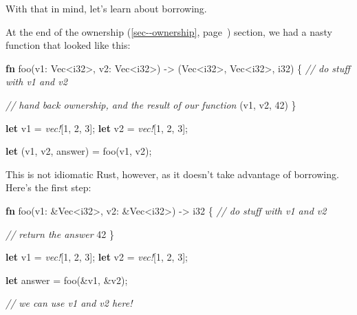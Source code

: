 \documentclass[a4paper,]{book}
\renewcommand*{\hyperref}[2][\ar]{%
  \def\ar{#2}%
  #2 (\autoref{#1}, page~\pageref{#1})}
\newenvironment{Shaded}{\begin{snugshade}}{\end{snugshade}}
\newcommand{\KeywordTok}[1]{\textcolor[rgb]{0.13,0.29,0.53}{\textbf{{#1}}}}
\newcommand{\DataTypeTok}[1]{\textcolor[rgb]{0.13,0.29,0.53}{{#1}}}
\newcommand{\DecValTok}[1]{\textcolor[rgb]{0.00,0.00,0.81}{{#1}}}
\newcommand{\CommentTok}[1]{\textcolor[rgb]{0.56,0.35,0.01}{\textit{{#1}}}}
\newcommand{\PreprocessorTok}[1]{\textcolor[rgb]{0.56,0.35,0.01}{\textit{{#1}}}}
\newcommand{\NormalTok}[1]{{#1}}
\begin{document}
With that in mind, let's learn about borrowing.


At the end of the \hyperref[sec--ownership]{ownership} section, we had a
nasty function that looked like this:

\begin{Shaded}
\begin{Highlighting}[]
\KeywordTok{fn} \NormalTok{foo(v1: }\DataTypeTok{Vec}\NormalTok{<}\DataTypeTok{i32}\NormalTok{>, v2: }\DataTypeTok{Vec}\NormalTok{<}\DataTypeTok{i32}\NormalTok{>) -> (}\DataTypeTok{Vec}\NormalTok{<}\DataTypeTok{i32}\NormalTok{>, }\DataTypeTok{Vec}\NormalTok{<}\DataTypeTok{i32}\NormalTok{>, }\DataTypeTok{i32}\NormalTok{) \{}
    \CommentTok{// do stuff with v1 and v2}

    \CommentTok{// hand back ownership, and the result of our function}
    \NormalTok{(v1, v2, }\DecValTok{42}\NormalTok{)}
\NormalTok{\}}

\KeywordTok{let} \NormalTok{v1 = }\PreprocessorTok{vec!}\NormalTok{[}\DecValTok{1}\NormalTok{, }\DecValTok{2}\NormalTok{, }\DecValTok{3}\NormalTok{];}
\KeywordTok{let} \NormalTok{v2 = }\PreprocessorTok{vec!}\NormalTok{[}\DecValTok{1}\NormalTok{, }\DecValTok{2}\NormalTok{, }\DecValTok{3}\NormalTok{];}

\KeywordTok{let} \NormalTok{(v1, v2, answer) = foo(v1, v2);}
\end{Highlighting}
\end{Shaded}

This is not idiomatic Rust, however, as it doesn't take advantage of
borrowing. Here's the first step:

\begin{Shaded}
\begin{Highlighting}[]
\KeywordTok{fn} \NormalTok{foo(v1: &}\DataTypeTok{Vec}\NormalTok{<}\DataTypeTok{i32}\NormalTok{>, v2: &}\DataTypeTok{Vec}\NormalTok{<}\DataTypeTok{i32}\NormalTok{>) -> }\DataTypeTok{i32} \NormalTok{\{}
    \CommentTok{// do stuff with v1 and v2}

    \CommentTok{// return the answer}
    \DecValTok{42}
\NormalTok{\}}

\KeywordTok{let} \NormalTok{v1 = }\PreprocessorTok{vec!}\NormalTok{[}\DecValTok{1}\NormalTok{, }\DecValTok{2}\NormalTok{, }\DecValTok{3}\NormalTok{];}
\KeywordTok{let} \NormalTok{v2 = }\PreprocessorTok{vec!}\NormalTok{[}\DecValTok{1}\NormalTok{, }\DecValTok{2}\NormalTok{, }\DecValTok{3}\NormalTok{];}

\KeywordTok{let} \NormalTok{answer = foo(&v1, &v2);}

\CommentTok{// we can use v1 and v2 here!}
\end{Highlighting}
\end{Shaded}
\end{document}
